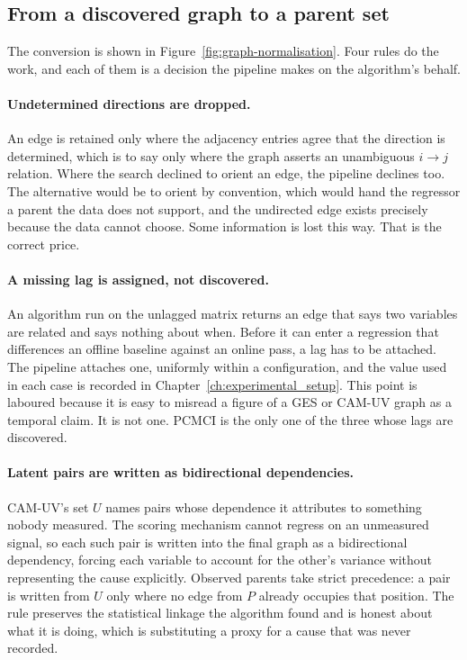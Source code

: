 \subsection{From a discovered graph to a parent set}
\label{sec:integration-verification}

The conversion is shown in Figure~\ref{fig:graph-normalisation}. Four rules do the work, and each of them is a decision the pipeline makes on the algorithm's behalf.

\paragraph{Undetermined directions are dropped.} An edge is retained only where the adjacency entries agree that the direction is determined, which is to say only where the graph asserts an unambiguous $i \to j$ relation. Where the search declined to orient an edge, the pipeline declines too. The alternative would be to orient by convention, which would hand the regressor a parent the data does not support, and the undirected edge exists precisely because the data cannot choose. Some information is lost this way. That is the correct price.

\paragraph{A missing lag is assigned, not discovered.} An algorithm run on the unlagged matrix returns an edge that says two variables are related and says nothing about when. Before it can enter a regression that differences an offline baseline against an online pass, a lag has to be attached. The pipeline attaches one, uniformly within a configuration, and the value used in each case is recorded in Chapter~\ref{ch:experimental_setup}. This point is laboured because it is easy to misread a figure of a GES or CAM-UV graph as a temporal claim. It is not one. PCMCI is the only one of the three whose lags are discovered.

\paragraph{Latent pairs are written as bidirectional dependencies.} CAM-UV's set $U$ names pairs whose dependence it attributes to something nobody measured. The scoring mechanism cannot regress on an unmeasured signal, so each such pair is written into the final graph as a bidirectional dependency, forcing each variable to account for the other's variance without representing the cause explicitly. Observed parents take strict precedence: a pair is written from $U$ only where no edge from $P$ already occupies that position. The rule preserves the statistical linkage the algorithm found and is honest about what it is doing, which is substituting a proxy for a cause that was never recorded.

